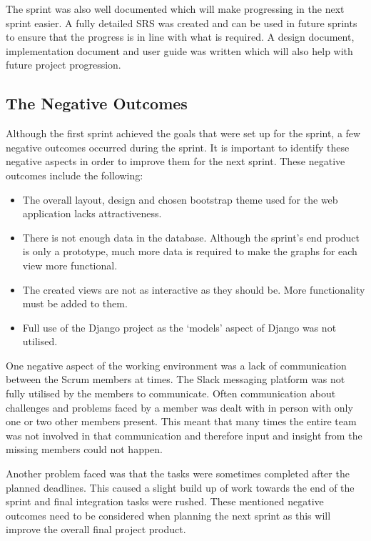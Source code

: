 \documentclass[12pt,onecolumn]{article}
\begin{document}
	The sprint was also well documented which will make progressing in the next sprint easier. A fully detailed SRS was created and can be used in future sprints to ensure that the progress is in line with what is required. A design document, implementation document and user guide was written which will also help with future project progression. 
	
	\subsection{The Negative Outcomes} \label{neg}
	Although the first sprint achieved the goals that were set up for the sprint, a few negative outcomes occurred during the sprint. It is important to identify these negative aspects in order to improve them for the next sprint. These negative outcomes include the following:
	
	\begin{itemize}
		\item The overall layout, design and chosen bootstrap theme used for the web application lacks attractiveness.
		\item There is not enough data in the database. Although the sprint's end product is only a prototype, much more data is required to make the graphs for each view more functional.
		\item The created views are not as interactive as they should be. More functionality must be added to them.
		\item Full use of the Django project as the `models' aspect of Django was not utilised. 
	\end{itemize}
	
	One negative aspect of the working environment was a lack of communication between the Scrum members at times. The Slack messaging platform was not fully utilised by the members to communicate. Often communication about challenges and problems faced by a member was dealt with in person with only one or two other members present. This meant that many times the entire team was not involved in that communication and therefore input and insight from the missing members could not happen. 
	
	Another problem faced was that the tasks were sometimes completed after the planned deadlines. This caused a slight build up of work towards the end of the sprint and final integration tasks were rushed. These mentioned negative outcomes need to be considered when planning the next sprint as this will improve the overall final project product.
	
\end{document}
